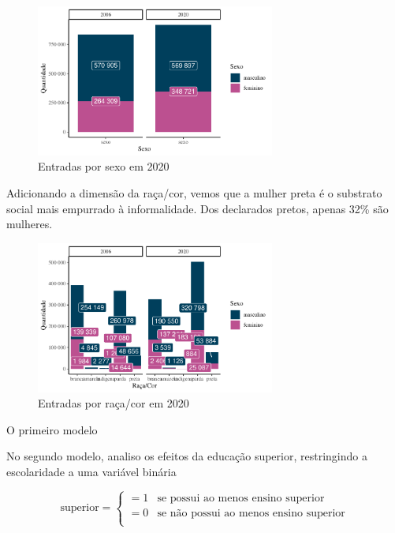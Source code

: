 \documentclass[
  12pt,
  letterpaper,
  DIV=11,
  numbers=noendperiod]{scrartcl}
\begin{document}
\begin{figure}

{\centering \includegraphics[width=0.7\textwidth,height=\textheight]{monografia_files/figure-pdf/count sexo-1.pdf}

}

\caption{Entradas por sexo em 2020}

\end{figure}

Adicionando a dimensão da raça/cor, vemos que a mulher preta é o
substrato social mais empurrado à informalidade. Dos declarados pretos,
apenas 32\% são mulheres.

\begin{figure}

{\centering \includegraphics[width=0.7\textwidth,height=\textheight]{monografia_files/figure-pdf/count raca e cor-1.pdf}

}

\caption{Entradas por raça/cor em 2020}

\end{figure}

O primeiro modelo

No segundo modelo, analiso os efeitos da educação superior, restringindo
a escolaridade a uma variável binária

\[
\text{superior}=
\begin{cases}
    =1 & \text{se possui ao menos ensino superior} \\
    =0 & \text{se não possui ao menos ensino superior} \\
\end{cases}
\]
\end{document}
